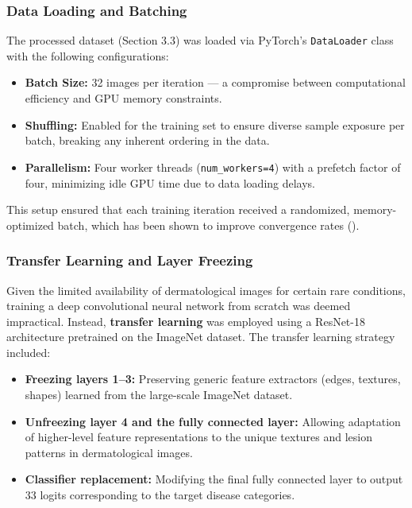 \documentclass[
  12pt,
  oneside]{article}
\providecommand{\tightlist}{%
  \setlength{\itemsep}{0pt}\setlength{\parskip}{0pt}}
\begin{document}
\subsubsection{Data Loading and
Batching}\label{data-loading-and-batching}

The processed dataset (Section 3.3) was loaded via PyTorch's
\texttt{DataLoader} class with the following configurations:

\begin{itemize}
\tightlist
\item
  \textbf{Batch Size:} 32 images per iteration --- a compromise between
  computational efficiency and GPU memory constraints.
\item
  \textbf{Shuffling:} Enabled for the training set to ensure diverse
  sample exposure per batch, breaking any inherent ordering in the data.
\item
  \textbf{Parallelism:} Four worker threads (\texttt{num\_workers=4})
  with a prefetch factor of four, minimizing idle GPU time due to data
  loading delays.
\end{itemize}

This setup ensured that each training iteration received a randomized,
memory-optimized batch, which has been shown to improve convergence
rates ().

\subsubsection{Transfer Learning and Layer
Freezing}\label{transfer-learning-and-layer-freezing}

Given the limited availability of dermatological images for certain rare
conditions, training a deep convolutional neural network from scratch
was deemed impractical. Instead, \textbf{transfer learning} was employed
using a ResNet-18 architecture pretrained on the ImageNet dataset. The
transfer learning strategy included:

\begin{itemize}
\tightlist
\item
  \textbf{Freezing layers 1--3:} Preserving generic feature extractors
  (edges, textures, shapes) learned from the large-scale ImageNet
  dataset.
\item
  \textbf{Unfreezing layer 4 and the fully connected layer:} Allowing
  adaptation of higher-level feature representations to the unique
  textures and lesion patterns in dermatological images.
\item
  \textbf{Classifier replacement:} Modifying the final fully connected
  layer to output 33 logits corresponding to the target disease
  categories.
\end{itemize}
\end{document}
